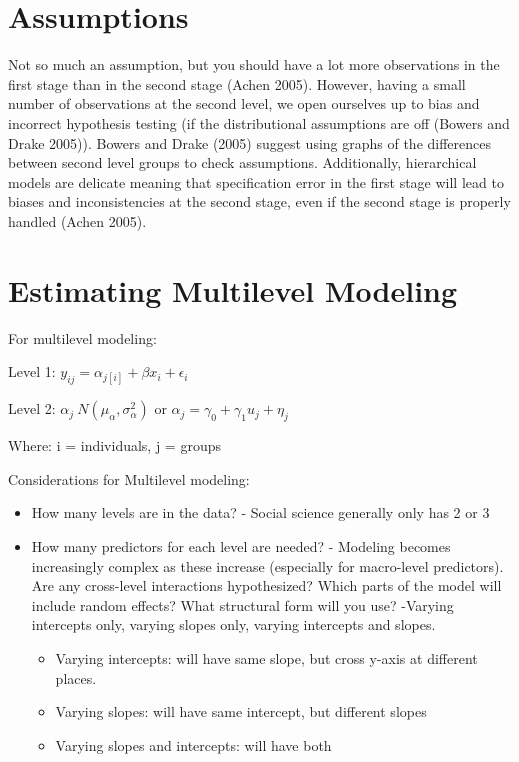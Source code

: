 \documentclass[]{book}
\providecommand{\tightlist}{%
  \setlength{\itemsep}{0pt}\setlength{\parskip}{0pt}}
\begin{document}
\section{Assumptions}\label{assumptions}

Not so much an assumption, but you should have a lot more observations
in the first stage than in the second stage (Achen 2005). However,
having a small number of observations at the second level, we open
ourselves up to bias and incorrect hypothesis testing (if the
distributional assumptions are off (Bowers and Drake 2005)). Bowers and
Drake (2005) suggest using graphs of the differences between second
level groups to check assumptions. Additionally, hierarchical models are
delicate meaning that specification error in the first stage will lead
to biases and inconsistencies at the second stage, even if the second
stage is properly handled (Achen 2005).

\section{Estimating Multilevel
Modeling}\label{estimating-multilevel-modeling}

For multilevel modeling:

Level 1: \(y_{ij} = \alpha_{j[i]} + \beta x_i + \epsilon_i\)

Level 2: \(\alpha_j ~ N(\mu_\alpha,\sigma^2_\alpha)\) or
\(\alpha_j = \gamma_0 + \gamma_1u_j + \eta_j\)

Where: i = individuals, j = groups

Considerations for Multilevel modeling:

\begin{itemize}
\tightlist
\item
  How many levels are in the data? - Social science generally only has 2
  or 3
\item
  How many predictors for each level are needed? - Modeling becomes
  increasingly complex as these increase (especially for macro-level
  predictors). Are any cross-level interactions hypothesized? Which
  parts of the model will include random effects? What structural form
  will you use? -Varying intercepts only, varying slopes only, varying
  intercepts and slopes.

  \begin{itemize}
  \tightlist
  \item
    Varying intercepts: will have same slope, but cross y-axis at
    different places.\\
  \item
    Varying slopes: will have same intercept, but different slopes
  \item
    Varying slopes and intercepts: will have both
  \end{itemize}
\end{itemize}
\end{document}
